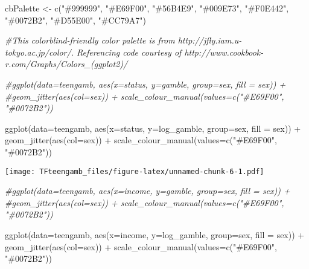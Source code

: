 \documentclass[
]{article}
\newenvironment{Shaded}{\begin{snugshade}}{\end{snugshade}}
\newcommand{\AttributeTok}[1]{\textcolor[rgb]{0.77,0.63,0.00}{#1}}
\newcommand{\CommentTok}[1]{\textcolor[rgb]{0.56,0.35,0.01}{\textit{#1}}}
\newcommand{\FunctionTok}[1]{\textcolor[rgb]{0.00,0.00,0.00}{#1}}
\newcommand{\NormalTok}[1]{#1}
\newcommand{\OtherTok}[1]{\textcolor[rgb]{0.56,0.35,0.01}{#1}}
\newcommand{\SpecialCharTok}[1]{\textcolor[rgb]{0.00,0.00,0.00}{#1}}
\newcommand{\StringTok}[1]{\textcolor[rgb]{0.31,0.60,0.02}{#1}}
\begin{document}
\begin{Shaded}
\begin{Highlighting}[]
\NormalTok{cbPalette }\OtherTok{\textless{}{-}} \FunctionTok{c}\NormalTok{(}\StringTok{"\#999999"}\NormalTok{, }\StringTok{"\#E69F00"}\NormalTok{, }\StringTok{"\#56B4E9"}\NormalTok{, }\StringTok{"\#009E73"}\NormalTok{, }\StringTok{"\#F0E442"}\NormalTok{, }\StringTok{"\#0072B2"}\NormalTok{, }\StringTok{"\#D55E00"}\NormalTok{, }\StringTok{"\#CC79A7"}\NormalTok{)}

\CommentTok{\#This colorblind{-}friendly color palette is from http://jfly.iam.u{-}tokyo.ac.jp/color/.  Referencing code courtesy of http://www.cookbook{-}r.com/Graphs/Colors\_(ggplot2)/}

\CommentTok{\#ggplot(data=teengamb, aes(x=status, y=gamble, group=sex, fill = sex)) + }
  \CommentTok{\#geom\_jitter(aes(col=sex)) + scale\_colour\_manual(values=c("\#E69F00", "\#0072B2"))}

\FunctionTok{ggplot}\NormalTok{(}\AttributeTok{data=}\NormalTok{teengamb, }\FunctionTok{aes}\NormalTok{(}\AttributeTok{x=}\NormalTok{status, }\AttributeTok{y=}\NormalTok{log\_gamble, }\AttributeTok{group=}\NormalTok{sex, }\AttributeTok{fill =}\NormalTok{ sex)) }\SpecialCharTok{+} \FunctionTok{geom\_jitter}\NormalTok{(}\FunctionTok{aes}\NormalTok{(}\AttributeTok{col=}\NormalTok{sex)) }\SpecialCharTok{+} \FunctionTok{scale\_colour\_manual}\NormalTok{(}\AttributeTok{values=}\FunctionTok{c}\NormalTok{(}\StringTok{"\#E69F00"}\NormalTok{, }\StringTok{"\#0072B2"}\NormalTok{))}
\end{Highlighting}
\end{Shaded}

\texttt{[image: TFteengamb\_files/figure-latex/unnamed-chunk-6-1.pdf]}

\begin{Shaded}
\begin{Highlighting}[]
\CommentTok{\#ggplot(data=teengamb, aes(x=income, y=gamble, group=sex, fill = sex)) + }
  \CommentTok{\#geom\_jitter(aes(col=sex)) + scale\_colour\_manual(values=c("\#E69F00", "\#0072B2"))}

\FunctionTok{ggplot}\NormalTok{(}\AttributeTok{data=}\NormalTok{teengamb, }\FunctionTok{aes}\NormalTok{(}\AttributeTok{x=}\NormalTok{income, }\AttributeTok{y=}\NormalTok{log\_gamble, }\AttributeTok{group=}\NormalTok{sex, }\AttributeTok{fill =}\NormalTok{ sex)) }\SpecialCharTok{+} \FunctionTok{geom\_jitter}\NormalTok{(}\FunctionTok{aes}\NormalTok{(}\AttributeTok{col=}\NormalTok{sex)) }\SpecialCharTok{+} \FunctionTok{scale\_colour\_manual}\NormalTok{(}\AttributeTok{values=}\FunctionTok{c}\NormalTok{(}\StringTok{"\#E69F00"}\NormalTok{, }\StringTok{"\#0072B2"}\NormalTok{))}
\end{Highlighting}
\end{Shaded}
\end{document}

